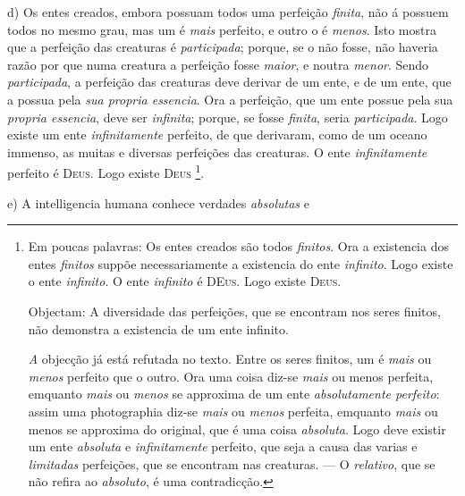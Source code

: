  d) Os entes creados, embora possuam todos uma perfeição \emph{finita}, não á possuem todos no mesmo grau, mas um é \emph{mais} perfeito, e outro o é \emph{menos}. Isto mostra que a perfeição das creaturas é \emph{participada}; porque, se o não fosse, não haveria razão por que numa creatura a perfeição fosse \emph{maior}, e noutra \emph{menor}. Sendo \emph{participada}, a perfeição das creaturas deve derivar de um ente, e de um ente, que a possua pela \emph{sua propria essencia}. Ora a perfeição, que um ente possue pela sua \emph{propria essencia}, deve ser \emph{infinita}; porque, se fosse \emph{finita}, seria \emph{participada}. Logo existe um ente \emph{infinitamente} perfeito, de que derivaram, como de um oceano immenso, as muitas e diversas perfeições das creaturas. O ente \emph{infinitamente} perfeito é \textsc{Deus}. Logo existe \textsc{Deus} \footnote{Em poucas palavras: Os entes creados são todos \emph{finitos}. Ora a existencia dos entes \emph{finitos} suppõe necessariamente a existencia do ente \emph{infinito}. Logo existe o ente \emph{infinito}. O ente \emph{infinito} é \textsc{DEus}. Logo existe \textsc{Deus}.\par Objectam: A diversidade das perfeições, que se encontram nos seres finitos, não demonstra a existencia de um ente infinito.\par \emph{A} objecção já está refutada no texto. Entre os seres finitos, um é \emph{mais} ou \emph{menos} perfeito que o outro. Ora uma coisa diz-se \emph{mais} ou menos perfeita, emquanto \emph{mais} ou \emph{menos} se approxima de um ente \emph{absolutamente perfeito}: assim uma photographia diz-se \emph{mais} ou \emph{menos} perfeita, emquanto \emph{mais} ou menos se approxima do original, que é uma coisa \emph{absoluta}. Logo deve existir um ente \emph{absoluta} e \emph{infinitamente} perfeito, que seja a causa das varias e \emph{limitadas} perfeições, que se encontram nas creaturas. --- O \emph{relativo}, que se não refira ao \emph{absoluto}, é uma contradicção.}.

e) A intelligencia humana conhece verdades \emph{absolutas} e

